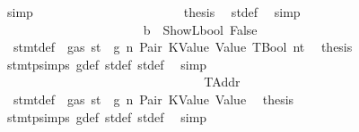 \begin{isabellebody}
\ simp\isanewline
\ \ \ \ \ \ \ \ \ \ \ \ \ \ \ \ \ \ \ \ \isamarkupfalse%
\ \isamarkupfalse%
\ {\isacharquery}{\kern0pt}thesis\ \isamarkupfalse%
\ st{\isacharprime}{\kern0pt}{\isacharunderscore}{\kern0pt}def\ \isamarkupfalse%
\ simp\isanewline
\ \ \ \ \ \ \ \ \ \ \ \ \ \ \ \ \ \ \isamarkupfalse%
\isanewline
\ \ \ \ \ \ \ \ \ \ \ \ \ \ \ \ \ \ \ \ \isamarkupfalse%
\ {\isachardoublequoteopen}{\isasymnot}\ b\ {\isacharequal}{\kern0pt}\ ShowL\isactrlsub b\isactrlsub o\isactrlsub o\isactrlsub l\ False{\isachardoublequoteclose}\isanewline
\ \ \ \ \ \ \ \ \ \ \ \ \ \ \ \ \ \ \ \ \isamarkupfalse%
\ {}{\isacharparenleft}{\kern0pt}{}{\isacharparenright}{\kern0pt}\ stmt{\isacharunderscore}{\kern0pt}def\ {\isacharbackquoteopen}{\isasymnot}\ gas\ st\ {\isasymle}\ g{\isacharbackquoteclose}\ n\ Pair\ KValue\ Value\ TBool\ nt\ \isamarkupfalse%
\ {\isacharquery}{\kern0pt}thesis\ \isamarkupfalse%
\ stmt{\isachardot}{\kern0pt}psimps{\isacharparenleft}{\kern0pt}{}{\isacharparenright}{\kern0pt}\ g{\isacharunderscore}{\kern0pt}def\ st{\isacharprime}{\kern0pt}{\isacharunderscore}{\kern0pt}def\ st{\isacharprime}{\kern0pt}{\isacharprime}{\kern0pt}{\isacharunderscore}{\kern0pt}def\ \isamarkupfalse%
\ simp\isanewline
\ \ \ \ \ \ \ \ \ \ \ \ \ \ \ \ \ \ \isamarkupfalse%
\isanewline
\ \ \ \ \ \ \ \ \ \ \ \ \ \ \ \ \isamarkupfalse%
\isanewline
\ \ \ \ \ \ \ \ \ \ \ \ \ \ \isamarkupfalse%
\isanewline
\ \ \ \ \ \ \ \ \ \ \ \ \ \ \ \ \isamarkupfalse%
\ TAddr\isanewline
\ \ \ \ \ \ \ \ \ \ \ \ \ \ \ \ \isamarkupfalse%
\ {}{\isacharparenleft}{\kern0pt}{}{\isacharparenright}{\kern0pt}\ stmt{\isacharunderscore}{\kern0pt}def\ {\isacharbackquoteopen}{\isasymnot}\ gas\ st\ {\isasymle}\ g{\isacharbackquoteclose}\ n\ Pair\ KValue\ Value\ \isamarkupfalse%
\ {\isacharquery}{\kern0pt}thesis\ \isamarkupfalse%
\ stmt{\isachardot}{\kern0pt}psimps{\isacharparenleft}{\kern0pt}{}{\isacharparenright}{\kern0pt}\ g{\isacharunderscore}{\kern0pt}def\ st{\isacharprime}{\kern0pt}{\isacharunderscore}{\kern0pt}def\ st{\isacharprime}{\kern0pt}{\isacharprime}{\kern0pt}{\isacharunderscore}{\kern0pt}def\ \isamarkupfalse%
\ simp\isanewline
\ \ \ \ \ \ \ \ \ \ \ \ \ \ \isamarkupfalse%
\isanewline
\ \ \ \ \ \ \ \ \ \ \ \ \isamarkupfalse%

\end{isabellebody}

